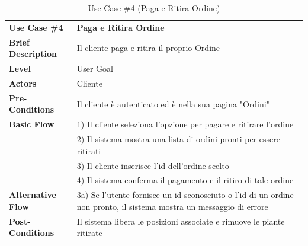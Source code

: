 \documentclass{article}
\begin{document}
\begin{table}[p]
    \begin{tabularx}{\textwidth}{ | l  X | }
        \rowcolor{lightgray!70}
        \hline
        \textbf{Use Case \#4} & \textbf{Paga e Ritira Ordine }\\[0.5ex]
        \textbf{Brief Description} & Il cliente paga e ritira il proprio Ordine\\
        \rowcolor{blue!10}
        \textbf{Level} & User Goal \\
        \textbf{Actors} & Cliente \\
        \rowcolor{blue!10}
        \textbf{Pre-Conditions} & Il cliente è autenticato ed è nella sua pagina "Ordini" \\
        \textbf{Basic Flow} & 1) Il cliente seleziona l'opzione per pagare e ritirare l'ordine\\
        & 2) Il sistema mostra una lista di ordini pronti per essere ritirati\\
        & 3) Il cliente inserisce l'id dell'ordine scelto\\
        & 4) Il sistema conferma il pagamento e il ritiro di tale ordine\\
        \rowcolor{blue!10}
        \textbf{Alternative Flow} & 3a) Se l'utente fornisce un id sconosciuto o l'id di un ordine non pronto, il sistema mostra un messaggio di errore\\
        \textbf{Post-Conditions} & Il sistema libera le posizioni associate e rimuove le piante ritirate \\
        \hline
    \end{tabularx}
    \caption{Use Case \#4 (Paga e Ritira Ordine)}
\end{table}
\end{document}
